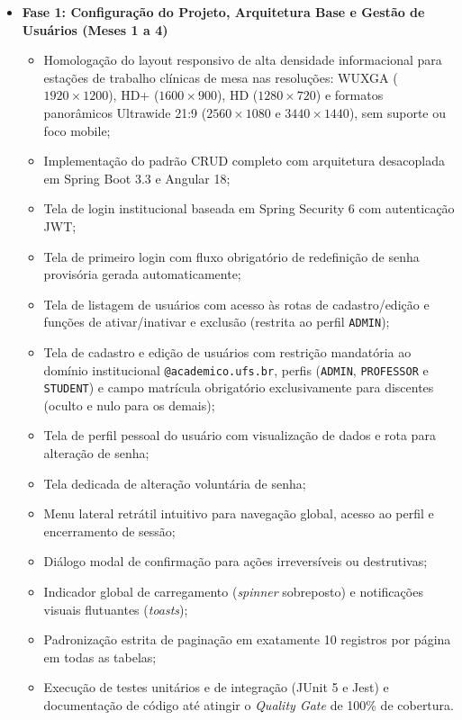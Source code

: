 \begin{itemize}
    \item \textbf{Fase 1: Configuração do Projeto, Arquitetura Base e Gestão de Usuários (Meses 1 a 4)}
    \begin{itemize}
        \item Homologação do layout responsivo de alta densidade informacional para estações de trabalho clínicas de mesa nas resoluções: WUXGA ($1920 \times 1200$), HD+ ($1600 \times 900$), HD ($1280 \times 720$) e formatos panorâmicos Ultrawide 21:9 ($2560 \times 1080$ e $3440 \times 1440$), sem suporte ou foco mobile;
        \item Implementação do padrão CRUD completo com arquitetura desacoplada em Spring Boot 3.3 e Angular 18;
        \item Tela de login institucional baseada em Spring Security 6 com autenticação JWT;
        \item Tela de primeiro login com fluxo obrigatório de redefinição de senha provisória gerada automaticamente;
        \item Tela de listagem de usuários com acesso às rotas de cadastro/edição e funções de ativar/inativar e exclusão (restrita ao perfil \texttt{ADMIN});
        \item Tela de cadastro e edição de usuários com restrição mandatória ao domínio institucional \texttt{@academico.ufs.br}, perfis (\texttt{ADMIN}, \texttt{PROFESSOR} e \texttt{STUDENT}) e campo matrícula obrigatório exclusivamente para discentes (oculto e nulo para os demais);
        \item Tela de perfil pessoal do usuário com visualização de dados e rota para alteração de senha;
        \item Tela dedicada de alteração voluntária de senha;
        \item Menu lateral retrátil intuitivo para navegação global, acesso ao perfil e encerramento de sessão;
        \item Diálogo modal de confirmação para ações irreversíveis ou destrutivas;
        \item Indicador global de carregamento (\textit{spinner} sobreposto) e notificações visuais flutuantes (\textit{toasts});
        \item Padronização estrita de paginação em exatamente 10 registros por página em todas as tabelas;
        \item Execução de testes unitários e de integração (JUnit 5 e Jest) e documentação de código até atingir o \textit{Quality Gate} de 100\% de cobertura.
    \end{itemize}


\end{itemize}
